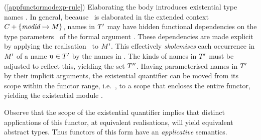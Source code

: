 \begin{description}
\item{(\ref{appfunctormodexp-rule})}
     Elaborating the body introduces existential type names \T.  In
     general, because \modexp\ is elaborated in the extended context $
     C+\{{\it modid}\mapsto M\}$, names in $T'$ may have hidden
     functional dependencies on the type parameters \T\ of the formal
     argument \modid.  These dependencies are made explicit by
     applying the realisation \tyrea\ to $M'$. This effectively
     \emph{skolemises} each occurrence in $M'$ of a name ${\rm u}^{{}}\in T'$
     by the names in \T. The kinds of names in $T'$ must be adjusted
     to reflect this, yielding the set $T''$. 
     Having parameterised names in $T'$ by
     their implicit arguments, the existential quantifier can be moved
     from its scope within the functor range, i.e.\ ,
     to a scope that encloses the entire functor, yielding the
     existential module .

     Observe that the scope of the existential quantifier implies
     that distinct applications of this functor, at equivalent
     realisations, will yield equivalent abstract types. 
     Thus functors of this form have an {\sl applicative} semantics.
\end{description}

